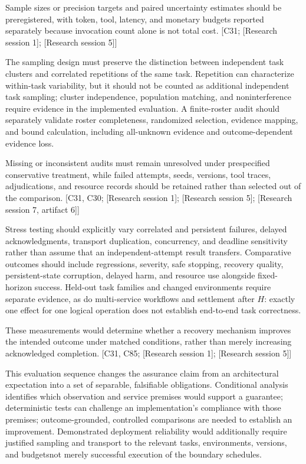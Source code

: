 \documentclass[11pt]{article}
\begin{document}
Sample sizes or precision targets and paired uncertainty estimates should be preregistered, with token, tool, latency, and monetary budgets reported separately because invocation count alone is not total cost. [C31; [Research session 1]; [Research session 5]]

The sampling design must preserve the distinction between independent task clusters and correlated repetitions of the same task. Repetition can characterize within-task variability, but it should not be counted as additional independent task sampling; cluster independence, population matching, and noninterference require evidence in the implemented evaluation. A finite-roster audit should separately validate roster completeness, randomized selection, evidence mapping, and bound calculation, including all-unknown evidence and outcome-dependent evidence loss.

Missing or inconsistent audits must remain unresolved under prespecified conservative treatment, while failed attempts, seeds, versions, tool traces, adjudications, and resource records should be retained rather than selected out of the comparison. [C31, C30; [Research session 1]; [Research session 5]; [Research session 7, artifact 6]]

Stress testing should explicitly vary correlated and persistent failures, delayed acknowledgments, transport duplication, concurrency, and deadline sensitivity rather than assume that an independent-attempt result transfers. Comparative outcomes should include regressions, severity, safe stopping, recovery quality, persistent-state corruption, delayed harm, and resource use alongside fixed-horizon success. Held-out task families and changed environments require separate evidence, as do multi-service workflows and settlement after $H$: exactly one effect for one logical operation does not establish end-to-end task correctness.

These measurements would determine whether a recovery mechanism improves the intended outcome under matched conditions, rather than merely increasing acknowledged completion. [C31, C85; [Research session 1]; [Research session 5]]

This evaluation sequence changes the assurance claim from an architectural expectation into a set of separable, falsifiable obligations. Conditional analysis identifies which observation and service premises would support a guarantee; deterministic tests can challenge an implementation's compliance with those premises; outcome-grounded, controlled comparisons are needed to establish an improvement. Demonstrated deployment reliability would additionally require justified sampling and transport to the relevant tasks, environments, versions, and budgets\textemdash{}not merely successful execution of the boundary schedules.
\end{document}
